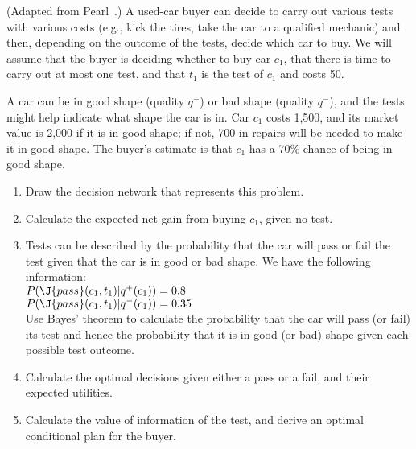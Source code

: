\begin{exercise} (Adapted from Pearl~\citeyear{Pearl:1988}.)
A used-car buyer can decide to carry out various tests with various costs
(e.g., kick the tires, take the car to a qualified mechanic) and then,
depending on the outcome of the tests, decide which car to buy. We will assume
that the buyer is deciding whether to buy car \(c_1\), that there is time to
carry out at most one test, and that \(t_1\) is the test of \(c_1\) and costs
{\DollarSign}50.

A car can be in good shape (quality \(q^+\)) or bad shape (quality
\(q^-\)), and the tests might help  indicate what shape the car is
in.  Car \(c_1\) costs {\DollarSign}1,500, and its market value is
{\DollarSign}2,000 if it is in good shape; if not, {\DollarSign}700 in
repairs will be needed to make it in good shape.  The buyer's estimate
is that \(c_1\) has a 70\% chance of being in good shape.
\begin{enumerate}
\item Draw the decision network that represents this problem.
\item Calculate the expected net gain from buying \(c_1\), given no test.

\item Tests can be described by the probability that the car will
pass or fail the test given that the car is in good or bad shape. We have the
following information:\\
\(P(\J{pass}(c_1,t_1) | q^+(c_1)) = {0.8}\)\\
\(P(\J{pass}(c_1,t_1) | q^-(c_1)) = {0.35}\)\\
Use Bayes' theorem to calculate the probability that the car will
pass (or fail) its test and hence the probability that it is in good
(or bad) shape given each possible test outcome.

\item Calculate the optimal decisions given either a pass or a fail,
and their expected utilities.

\item Calculate the value of information of the test, and derive an
optimal conditional plan for the buyer.
\end{enumerate}
\end{exercise} 

